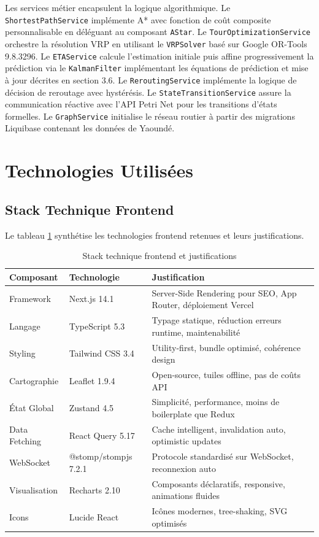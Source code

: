 Les services métier encapsulent la logique algorithmique. Le \texttt{ShortestPathService} implémente A* avec fonction de coût composite personnalisable en déléguant au composant \texttt{AStar}. Le \texttt{TourOptimizationService} orchestre la résolution VRP en utilisant le \texttt{VRPSolver} basé sur Google OR-Tools 9.8.3296. Le \texttt{ETAService} calcule l'estimation initiale puis affine progressivement la prédiction via le \texttt{KalmanFilter} implémentant les équations de prédiction et mise à jour décrites en section 3.6. Le \texttt{ReroutingService} implémente la logique de décision de reroutage avec hystérésis. Le \texttt{StateTransitionService} assure la communication réactive avec l'API Petri Net pour les transitions d'états formelles. Le \texttt{GraphService} initialise le réseau routier à partir des migrations Liquibase contenant les données de Yaoundé.

\section{Technologies Utilisées}

\subsection{Stack Technique Frontend}

Le tableau \ref{tab:stack_frontend} synthétise les technologies frontend retenues et leurs justifications.

\begin{table}[h]
\centering
\caption{Stack technique frontend et justifications}
\label{tab:stack_frontend}
\begin{tabular}{|l|l|p{6cm}|}
\hline
\textbf{Composant} & \textbf{Technologie} & \textbf{Justification} \\
\hline
Framework & Next.js 14.1 & Server-Side Rendering pour SEO, App Router, déploiement Vercel \\
\hline
Langage & TypeScript 5.3 & Typage statique, réduction erreurs runtime, maintenabilité \\
\hline
Styling & Tailwind CSS 3.4 & Utility-first, bundle optimisé, cohérence design \\
\hline
Cartographie & Leaflet 1.9.4 & Open-source, tuiles offline, pas de coûts API \\
\hline
État Global & Zustand 4.5 & Simplicité, performance, moins de boilerplate que Redux \\
\hline
Data Fetching & React Query 5.17 & Cache intelligent, invalidation auto, optimistic updates \\
\hline
WebSocket & @stomp/stompjs 7.2.1 & Protocole standardisé sur WebSocket, reconnexion auto \\
\hline
Visualisation & Recharts 2.10 & Composants déclaratifs, responsive, animations fluides \\
\hline
Icons & Lucide React & Icônes modernes, tree-shaking, SVG optimisés \\
\hline
\end{tabular}
\end{table}

